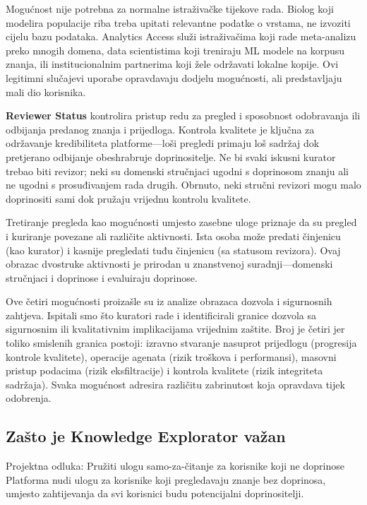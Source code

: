 \documentclass[12pt,a4paper]{article}
\begin{document}
Mogućnost nije potrebna za normalne istraživačke tijekove rada. Biolog koji modelira populacije riba treba upitati relevantne podatke o vrstama, ne izvoziti cijelu bazu podataka. Analytics Access služi istraživačima koji rade meta-analizu preko mnogih domena, data scientistima koji treniraju ML modele na korpusu znanja, ili institucionalnim partnerima koji žele održavati lokalne kopije. Ovi legitimni slučajevi uporabe opravdavaju dodjelu mogućnosti, ali predstavljaju mali dio korisnika.

\textbf{Reviewer Status} kontrolira pristup redu za pregled i sposobnost odobravanja ili odbijanja predanog znanja i prijedloga. Kontrola kvalitete je ključna za održavanje kredibiliteta platforme—loši pregledi primaju loš sadržaj dok pretjerano odbijanje obeshrabruje doprinositelje. Ne bi svaki iskusni kurator trebao biti revizor; neki su domenski stručnjaci ugodni s doprinosom znanju ali ne ugodni s prosuđivanjem rada drugih. Obrnuto, neki stručni revizori mogu malo doprinositi sami dok pružaju vrijednu kontrolu kvalitete.

Tretiranje pregleda kao mogućnosti umjesto zasebne uloge priznaje da su pregled i kuriranje povezane ali različite aktivnosti. Ista osoba može predati činjenicu (kao kurator) i kasnije pregledati tuđu činjenicu (sa statusom revizora). Ovaj obrazac dvostruke aktivnosti je prirodan u znanstvenoj suradnji—domenski stručnjaci i doprinose i evaluiraju doprinose.

Ove četiri mogućnosti proizašle su iz analize obrazaca dozvola i sigurnosnih zahtjeva. Ispitali smo što kuratori rade i identificirali granice dozvola sa sigurnosnim ili kvalitativnim implikacijama vrijednim zaštite. Broj je četiri jer toliko smislenih granica postoji: izravno stvaranje nasuprot prijedlogu (progresija kontrole kvalitete), operacije agenata (rizik troškova i performansi), masovni pristup podacima (rizik eksfiltracije) i kontrola kvalitete (rizik integriteta sadržaja). Svaka mogućnost adresira različitu zabrinutost koja opravdava tijek odobrenja.

\subsection{Zašto je Knowledge Explorator važan}

\begin{rationale}{Projektna odluka: Pružiti ulogu samo-za-čitanje za korisnike koji ne doprinose}
Platforma nudi ulogu za korisnike koji pregledavaju znanje bez doprinosa, umjesto zahtijevanja da svi korisnici budu potencijalni doprinositelji.
\end{rationale}
\end{document}
